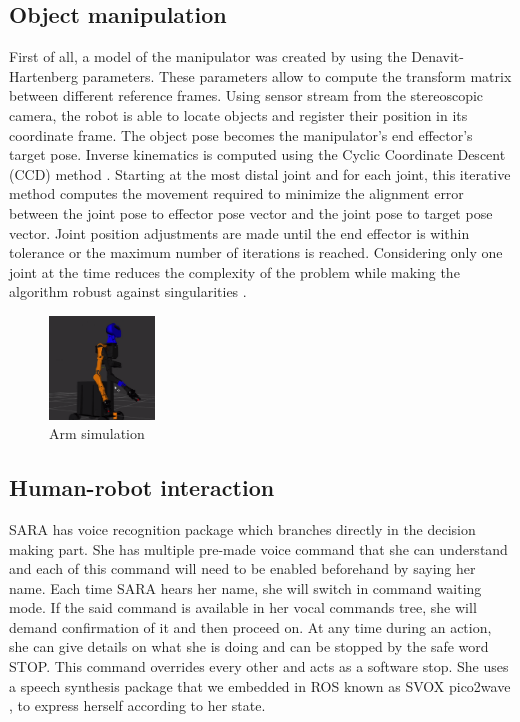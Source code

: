 \documentclass[runningheads,a4paper]{llncs}
\begin{document}
\subsection{Object manipulation}
\tab First of all, a model of the manipulator was created by using the Denavit-Hartenberg \cite{kinematic} parameters. These parameters allow to compute the transform matrix between different reference frames. Using sensor stream from the stereoscopic camera, the robot is able to locate objects and register their position in its coordinate frame. The object pose becomes the manipulator's end effector's target pose. Inverse kinematics is computed using the Cyclic Coordinate Descent (CCD) method \cite{coordinate}. Starting at the most distal joint and for each joint, this iterative method computes the movement required to minimize the alignment error between the joint pose to effector pose vector and the joint pose to target pose vector. Joint position adjustments are made until the end effector is within tolerance or the maximum number of iterations is reached. Considering only one joint at the time reduces the complexity of the problem while making the algorithm robust against singularities \cite{springer}. 
\begin{figure}
\centering
\includegraphics[width=0.25\textwidth]{images/arm_sim.png}
\caption{Arm simulation}
\end{figure}

\newpage
\subsection{Human-robot interaction}
\tab SARA has voice recognition package which branches directly in the decision making part. She has multiple pre-made voice command that she can understand and each of this command will need to be enabled beforehand by saying her name. Each time SARA hears her name, she will switch in command waiting mode. If the said command is available in her vocal commands tree, she will demand confirmation of it and then proceed on. At any time during an action, she can give details on what she is doing and can be stopped by the safe word STOP. This command overrides every other and acts as a software stop. She uses a speech synthesis package that we embedded in ROS known as SVOX pico2wave \cite{svox}, to express herself according to her state.\\
\end{document}
